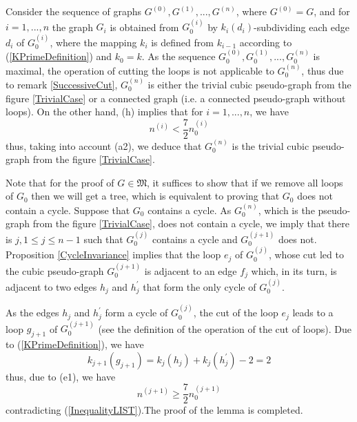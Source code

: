 \documentclass[fleqn,12pt,twoside]{article}
\newenvironment{proof}[1][Proof.]{\begin{trivlist}
\item[\hskip \labelsep {\bfseries #1}]}{\end{trivlist}}
\begin{document}
\begin{proof}
Consider the sequence of graphs $G^{(0)},G^{(1)},...,G^{(n)}$, where $G^{(0)}=G$, and for $i=1,...,n$ the graph $G_{i}$ is obtained from $G_{0}^{(i)}$ by $k_{i}(d_{i})$-subdividing each edge $d_{i}$ of $G_{0}^{(i)}$, where the mapping $k_{i}$ is defined from $k_{i-1}$ according to (\ref {KPrimeDefinition}) and $k_{0}=k$. As the sequence $G_{0}^{(0)},G_{0}^{(1)},...,G_{0}^{(n)}$ is maximal, the operation
of cutting the loops is not applicable to $G_{0}^{(n)}$, thus due to
remark \ref{SuccessiveCut}, $G_{0}^{(n)}$ is either the trivial
cubic pseudo-graph from the figure \ref{TrivialCase} or a connected
graph (i.e. a connected pseudo-graph without loops). On the other
hand, (h) implies that for $i=1,...,n$, we have
\begin{equation}
n^{(i)}<\frac{7}{2}n_{0}^{(i)}\label{InequalityLIST}
\end{equation}thus, taking into account (a2), we deduce that $G_{0}^{(n)}$ is the
trivial cubic pseudo-graph from the figure \ref{TrivialCase}.

Note that for the proof of $G\in \mathfrak{M}$, it suffices to show
that if we remove all loops of $G_{0}$ then we will get a tree,
which is equivalent to proving that $G_{0}$ does not contain a
cycle. Suppose that $G_{0}$ contains a cycle. As $G_{0}^{(n)}$,
which is the pseudo-graph from the
figure \ref{TrivialCase}, does not contain a cycle, we imply that there is $j,1\leq j\leq n-1$ such that $G_{0}^{(j)}$ contains a cycle and $G_{0}^{(j+1)}$ does not. Proposition \ref{CycleInvariance} implies
that the
loop $e_{j}$ of $G_{0}^{(j)}$, whose cut led to the cubic pseudo-graph $G_{0}^{(j+1)}$ is adjacent to an edge $f_{j}$ which, in its turn, is
adjacent to two edges $h_{j}$ and $h_{j}^{\prime }$ that form the
only cycle of $G_{0}^{(j)}$.

As the edges $h_{j}$ and $h_{j}^{\prime }$ form a cycle of
$G_{0}^{(j)}$,
the cut of the loop $e_{j}$ leads to a loop $g_{j+1}$ of $G_{0}^{(j+1)}$ (see the definition of the operation of the cut of
loops). Due to (\ref{KPrimeDefinition}), we have
\begin{equation*}
k_{j+1}(g_{j+1})=k_{j}(h_{j})+k_{j}(h_{j}^{\prime })-2=2
\end{equation*}thus, due to (e1), we have\begin{equation*}
n^{(j+1)}\geq \frac{7}{2}n_{0}^{(j+1)}
\end{equation*}contradicting (\ref{InequalityLIST}).The proof of the lemma is
completed.
\end{proof}
\end{document}
